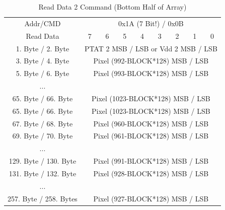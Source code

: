 \documentclass{deutez}
\begin{document}
	\begin{table}[h!]
		\begin{center}
			\caption{Read Data 2 Command (Bottom Half of Array)}
			\begin{tabular}{|c|c|c|c|c|c|c|c|c|} 
				\hline
				Addr/CMD & \multicolumn{8}{c|}{0x1A (7 Bit!) / 0x0B}\\\cline{1-9}
				Read Data &7&6&5&4&3&2&1&0\\
				\cline{1-9}
				1. Byte / 2. Byte & \multicolumn{8}{c|}{PTAT 2 MSB / LSB or Vdd 2 MSB / LSB}\\\cline{1-9}
				3. Byte / 4. Byte & \multicolumn{8}{c|}{Pixel (992-BLOCK*128) MSB / LSB}\\\cline{1-9}
				5. Byte / 6. Byte & \multicolumn{8}{c|}{Pixel (993-BLOCK*128) MSB / LSB}\\\cline{1-9}
				... & \multicolumn{8}{c|}{}\\\cline{1-9}	
				65. Byte / 66. Byte & \multicolumn{8}{c|}{Pixel (1023-BLOCK*128) MSB / LSB}\\\cline{1-9}
				
				65. Byte / 66. Byte & \multicolumn{8}{c|}{Pixel (1023-BLOCK*128) MSB / LSB}\\\cline{1-9}
				
				67. Byte / 68. Byte & \multicolumn{8}{c|}{Pixel (960-BLOCK*128) MSB / LSB}\\\cline{1-9}
				
				69. Byte / 70. Byte & \multicolumn{8}{c|}{Pixel (961-BLOCK*128) MSB / LSB}\\\cline{1-9}
				
				... & \multicolumn{8}{c|}{}\\\cline{1-9}
				
				129. Byte / 130. Byte & \multicolumn{8}{c|}{Pixel (991-BLOCK*128) MSB / LSB}\\\cline{1-9}
				
				131. Byte / 132. Byte & \multicolumn{8}{c|}{Pixel (928-BLOCK*128) MSB / LSB}\\\cline{1-9}
				
				...& \multicolumn{8}{c|}{}\\\cline{1-9}
				
				257. Byte / 258. Bytes& \multicolumn{8}{c|}{Pixel (927-BLOCK*128) MSB / LSB}\\\cline{1-9}
				
			\end{tabular}
		\end{center}
	\end{table}
	\FloatBarrier
\end{document}
